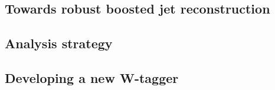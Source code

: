\subsection{Towards robust boosted jet reconstruction}
\subsection{Analysis strategy}
\subsection{Developing a new W-tagger}
\label{sec:searchII:puppisoftdrop}